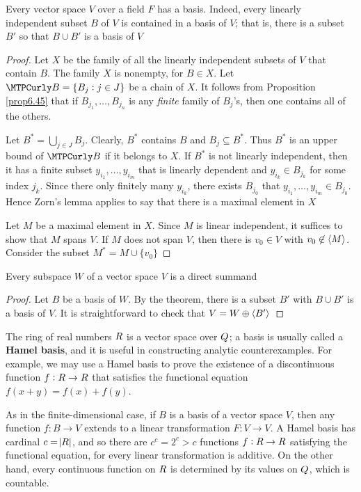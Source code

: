 \documentclass[11pt]{article}
\begin{document}
\begin{theorem}[]
Every vector space \(V\) over a field \(F\) has a basis. Indeed, every linearly
independent subset \(B\) of \(V\) is contained in a basis of \(V\); that is, there
is a subset \(B'\) so that \(B\cup B'\) is a basis of \(V\)
\end{theorem}


\begin{proof}
Let \(X\) be the family of all the linearly independent subsets of \(V\) that
contain \(B\). The family \(X\) is nonempty, for \(B\in X\). Let
\(\calb=\{B_j:j\in J\}\) be a chain of \(X\). It follows from Proposition 
\ref{prop6.45} that if \(B_{j_1},\dots,B_{j_n}\) is any \emph{finite} family of
\(B_j\)'s, then one contains all of the others.

Let \(B^*=\bigcup_{j\in J}B_j\). Clearly, \(B^*\) contains \(B\) and 
\(B_j\subseteq B^*\). Thus \(B^*\) is an upper bound of \(\calb\) if it
belongs to \(X\). If \(B^*\) is not linearly independent, then it has a finite
subset \(y_{i_1},\dots,y_{i_m}\) that is linearly dependent and 
\(y_{i_k}\in B_{j_k}\) for some index \(j_k\). Since there only finitely many 
\(y_{i_k}\), there exists \(B_{j_0}\) that 
\(y_{i_1},\dots,y_{i_m}\in B_{j_0}\). Hence Zorn's lemma applies to say that
there is a maximal element in \(X\)

Let \(M\) be a maximal element in \(X\). Since \(M\) is linear independent, it
suffices to show that \(M\) spans \(V\). If \(M\) does not span \(V\), then there
is \(v_0\in V\) with \(v_0\not\in\langle M\rangle\). Consider the subset 
\(M^*=M\cup\{v_0\}\)
\end{proof}

\begin{corollary}[]
Every subspace \(W\) of a vector space \(V\) is a direct summand
\end{corollary}
\begin{proof}
Let \(B\) be a basis of \(W\). By the theorem, there is a subset \(B'\) with 
\(B\cup B'\) is a basis of \(V\). It is straightforward to check that 
\(V=W\oplus\langle B'\rangle\)
\end{proof}

The ring of real numbers \(\relax{R}\) is a vector space over \(\relax{Q}\); a basis is
usually called a \textbf{Hamel basis}, and it is useful in constructing analytic
counterexamples. For example, we may use a Hamel basis to prove the existence
of a discontinuous function \(f:\relax{R}\to\relax{R}\) that satisfies the functional
equation \(f(x+y)=f(x)+f(y)\).

As in the finite-dimensional case, if \(B\) is a basis of a vector space \(V\),
then any function \(f:B\to V\) extends to a linear transformation \(F:V\to
   V\). A Hamel basis has cardinal \(c=\abs{\relax{R}}\), and so there are
\(c^c=2^c>c\) functions \(f:\relax{R}\to\relax{R}\) satisfying the functional equation, for
every linear transformation is additive. On the other hand, every continuous
function on \(\relax{R}\) is determined by its values on \(\relax{Q}\), which is countable.
\end{document}
